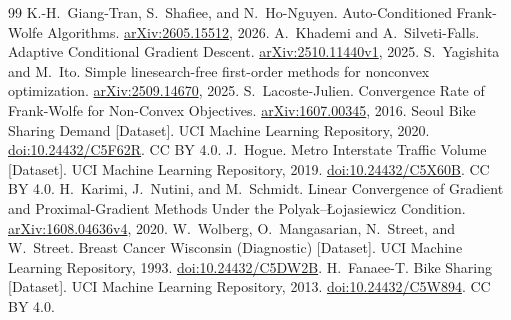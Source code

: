 \begin{thebibliography}{99}
 K.-H.~Giang-Tran, S.~Shafiee, and N.~Ho-Nguyen.
Auto-Conditioned Frank-Wolfe Algorithms.
\href{https://arxiv.org/abs/2605.15512}{arXiv:2605.15512}, 2026.
 A.~Khademi and A.~Silveti-Falls.
Adaptive Conditional Gradient Descent.
\href{https://arxiv.org/abs/2510.11440v1}{arXiv:2510.11440v1}, 2025.
 S.~Yagishita and M.~Ito.
Simple linesearch-free first-order methods for nonconvex optimization.
\href{https://arxiv.org/abs/2509.14670}{arXiv:2509.14670}, 2025.
 S.~Lacoste-Julien.
Convergence Rate of Frank-Wolfe for Non-Convex Objectives.
\href{https://arxiv.org/abs/1607.00345}{arXiv:1607.00345}, 2016.
 Seoul Bike Sharing Demand [Dataset].
UCI Machine Learning Repository, 2020.
\href{https://doi.org/10.24432/C5F62R}{doi:10.24432/C5F62R}. CC BY 4.0.
 J.~Hogue. Metro Interstate Traffic Volume [Dataset].
UCI Machine Learning Repository, 2019.
\href{https://doi.org/10.24432/C5X60B}{doi:10.24432/C5X60B}. CC BY 4.0.
 H.~Karimi, J.~Nutini, and M.~Schmidt.
Linear Convergence of Gradient and Proximal-Gradient Methods Under the
Polyak--{\L}ojasiewicz Condition.
\href{https://arxiv.org/abs/1608.04636v4}{arXiv:1608.04636v4}, 2020.
 W.~Wolberg, O.~Mangasarian, N.~Street, and W.~Street.
Breast Cancer Wisconsin (Diagnostic) [Dataset]. UCI Machine Learning Repository, 1993.
\href{https://doi.org/10.24432/C5DW2B}{doi:10.24432/C5DW2B}.
 H.~Fanaee-T. Bike Sharing [Dataset]. UCI Machine Learning Repository, 2013.
\href{https://doi.org/10.24432/C5W894}{doi:10.24432/C5W894}. CC BY 4.0.
\end{thebibliography}
